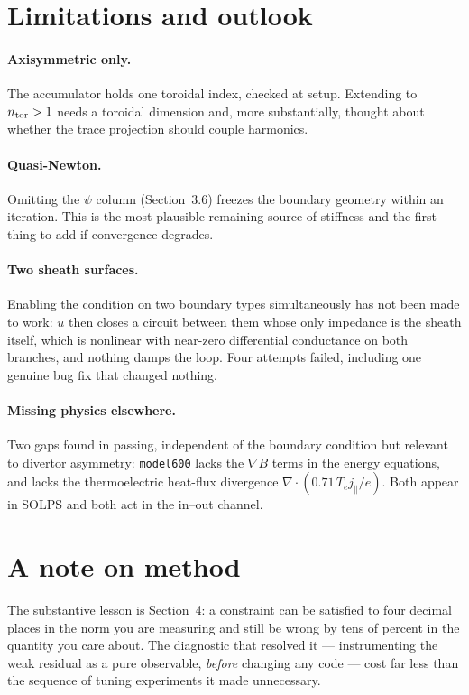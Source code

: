 \documentclass[11pt,a4paper]{article}
\newcommand{\code}[1]{\texttt{\small #1}}
\begin{document}
\section{Limitations and outlook}

\paragraph{Axisymmetric only.} The accumulator holds one toroidal index, checked at setup. Extending
to $n_{\rm tor}>1$ needs a toroidal dimension and, more substantially, thought about whether the trace
projection should couple harmonics.

\paragraph{Quasi-Newton.} Omitting the $\psi$ column (Section~3.6) freezes the boundary geometry within
an iteration. This is the most plausible remaining source of stiffness and the first thing to add if
convergence degrades.

\paragraph{Two sheath surfaces.} Enabling the condition on two boundary types simultaneously has not
been made to work: $u$ then closes a circuit between them whose only impedance is the sheath itself,
which is nonlinear with near-zero differential conductance on both branches, and nothing damps the
loop. Four attempts failed, including one genuine bug fix that changed nothing.

\paragraph{Missing physics elsewhere.} Two gaps found in passing, independent of the boundary condition
but relevant to divertor asymmetry: \code{model600} lacks the $\nabla B$ terms in the energy equations,
and lacks the thermoelectric heat-flux divergence $\nabla\!\cdot\!(0.71\,T_e j_\parallel/e)$. Both
appear in SOLPS and both act in the in--out channel.

\section*{A note on method}

The substantive lesson is Section~4: a constraint can be satisfied to four decimal places in the norm
you are measuring and still be wrong by tens of percent in the quantity you care about. The diagnostic
that resolved it --- instrumenting the weak residual as a pure observable, \emph{before} changing any
code --- cost far less than the sequence of tuning experiments it made unnecessary.
\end{document}
